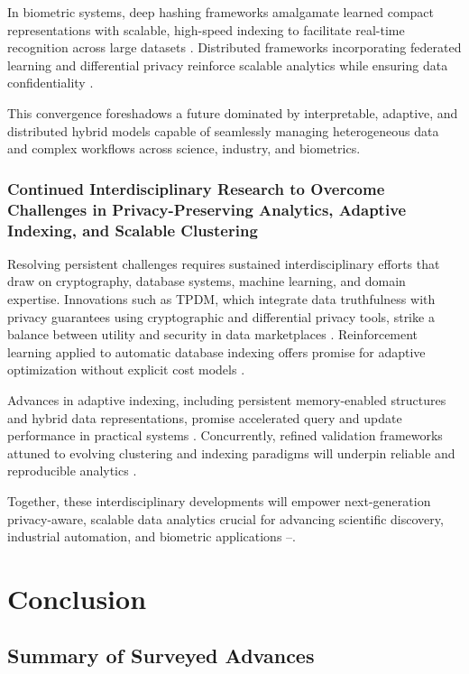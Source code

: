 \documentclass[11pt]{article}
\begin{document}
In biometric systems, deep hashing frameworks amalgamate learned compact representations with scalable, high-speed indexing to facilitate real-time recognition across large datasets \cite{ref29}. Distributed frameworks incorporating federated learning and differential privacy reinforce scalable analytics while ensuring data confidentiality \cite{ref25}.

This convergence foreshadows a future dominated by interpretable, adaptive, and distributed hybrid models capable of seamlessly managing heterogeneous data and complex workflows across science, industry, and biometrics.

\subsubsection{Continued Interdisciplinary Research to Overcome Challenges in Privacy-Preserving Analytics, Adaptive Indexing, and Scalable Clustering}

Resolving persistent challenges requires sustained interdisciplinary efforts that draw on cryptography, database systems, machine learning, and domain expertise. Innovations such as TPDM, which integrate data truthfulness with privacy guarantees using cryptographic and differential privacy tools, strike a balance between utility and security in data marketplaces \cite{ref30}. Reinforcement learning applied to automatic database indexing offers promise for adaptive optimization without explicit cost models \cite{ref34}.

Advances in adaptive indexing, including persistent memory-enabled structures and hybrid data representations, promise accelerated query and update performance in practical systems \cite{ref32}. Concurrently, refined validation frameworks attuned to evolving clustering and indexing paradigms will underpin reliable and reproducible analytics \cite{ref24}.

Together, these interdisciplinary developments will empower next-generation privacy-aware, scalable data analytics crucial for advancing scientific discovery, industrial automation, and biometric applications \cite{ref1}--\cite{ref35}.

\section{Conclusion}

\subsection{Summary of Surveyed Advances}
\end{document}
